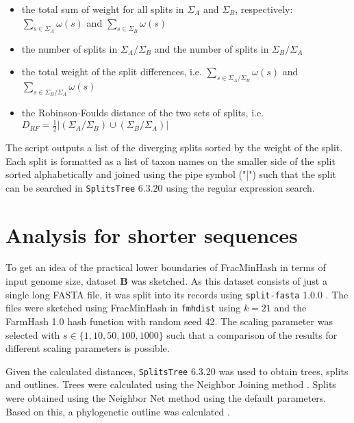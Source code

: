 \begin{itemize}
  \item the total sum of weight for all splits in $\Sigma_A$ and $\Sigma_B$,
  respectively: $\sum_{s \in \Sigma_A}{\omega(s)}$ and $\sum_{s \in
  \Sigma_B}{\omega(s)}$ 
  \item the number of splits in $\Sigma_A / \Sigma_B$ and the number of splits
  in $\Sigma_B / \Sigma_A$
  \item the total weight of the split differences, i.e.
  $\sum_{s \in \Sigma_A / \Sigma_B}{\omega(s)}$ and $\sum_{s \in \Sigma_B /
  \Sigma_A}{\omega(s)}$
  \item the Robinson-Foulds distance
  \cite{robinsonComparisonPhylogeneticTrees1981} of the two sets of splits, i.e.
  $D_{RF} = \frac{1}{2}|(\Sigma_A / \Sigma_B) \cup (\Sigma_B / \Sigma_A)|$
\end{itemize}

The script outputs a list of the diverging splits sorted by the weight of the
split. Each split is formatted as a list of taxon names on the smaller side of
the split sorted alphabetically and joined using the pipe symbol ("|") such that
the split can be searched in \texttt{SplitsTree} 6.3.20 using the regular
expression search.



\section{Analysis for shorter sequences}
To get an idea of the practical lower boundaries of FracMinHash in terms of
input genome size, dataset \textbf{B} was sketched. As this dataset consists of
just a single long FASTA file, it was split into its records using
\texttt{split-fasta} 1.0.0 \cite{vashishtSplitfasta2020}. The files were
sketched using FracMinHash
\cite{irberLightweightCompositionalAnalysis2022,heraDerivingConfidenceIntervals2023}
in \texttt{fmhdist} using $k=21$ and the FarmHash 1.0 hash function
\cite{pikeFarmhash2014,ZeroAllocationHashing2022} with random seed 42. The
scaling parameter was selected with  $s \in \{1, 10, 50, 100, 1000\}$ such that
a comparison of the results for different scaling parameters is possible.

Given the calculated distances, \texttt{SplitsTree} 6.3.20
\cite{husonApplicationPhylogeneticNetworks2006} was used to obtain trees, splits
and outlines. Trees were calculated using the Neighbor Joining method
\cite{saitouNeighborjoiningMethodNew1987}. Splits were obtained using the
Neighbor Net method
\cite{bryantNeighborNetAgglomerativeMethod2004,bryantNeighborNetImprovedAlgorithms2023}
using the default parameters. Based on this, a phylogenetic outline was
calculated \cite{bagciMicrobialPhylogeneticContext2021}.


